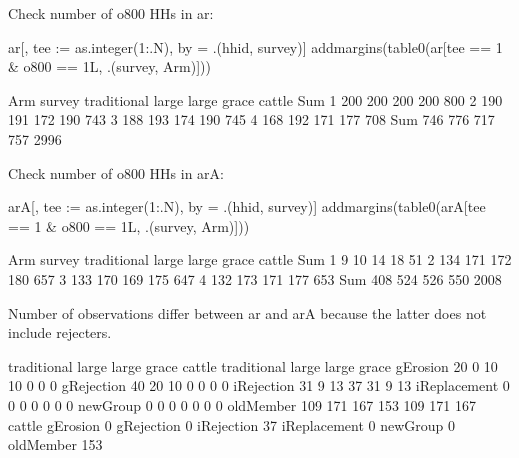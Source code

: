 Check number of \textsf{o800} HHs in \textsf{ar}:
\begin{Schunk}
\begin{Sinput}
ar[, tee := as.integer(1:.N), by = .(hhid, survey)]
addmargins(table0(ar[tee == 1 & o800 == 1L, .(survey, Arm)]))
\end{Sinput}
\begin{Soutput}
      Arm
survey traditional large large grace cattle  Sum
   1           200   200         200    200  800
   2           190   191         172    190  743
   3           188   193         174    190  745
   4           168   192         171    177  708
   Sum         746   776         717    757 2996
\end{Soutput}
\end{Schunk}
Check number of \textsf{o800} HHs in \textsf{arA}:
\begin{Schunk}
\begin{Sinput}
arA[, tee := as.integer(1:.N), by = .(hhid, survey)]
addmargins(table0(arA[tee == 1 & o800 == 1L, .(survey, Arm)]))
\end{Sinput}
\begin{Soutput}
      Arm
survey traditional large large grace cattle  Sum
   1             9    10          14     18   51
   2           134   171         172    180  657
   3           133   170         169    175  647
   4           132   173         171    177  653
   Sum         408   524         526    550 2008
\end{Soutput}
\end{Schunk}
Number of observations differ between \textsf{ar} and \textsf{arA} because the latter does not include rejecters. 
\begin{Schunk}
\begin{Soutput}
             traditional large large grace cattle traditional large large grace
gErosion              20     0          10     10           0     0           0
gRejection            40    20          10      0           0     0           0
iRejection            31     9          13     37          31     9          13
iReplacement           0     0           0      0           0     0           0
newGroup               0     0           0      0           0     0           0
oldMember            109   171         167    153         109   171         167
             cattle
gErosion          0
gRejection        0
iRejection       37
iReplacement      0
newGroup          0
oldMember       153
\end{Soutput}
\end{Schunk}
